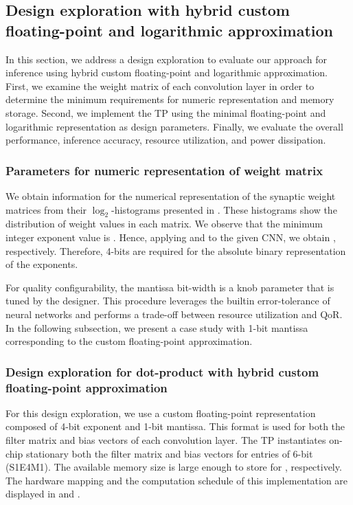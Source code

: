 \subsection{Design exploration with hybrid custom floating-point and logarithmic approximation}

In this section, we address a design exploration to evaluate our approach for inference using hybrid custom floating-point and logarithmic approximation. First, we examine the weight matrix of each convolution layer in order to determine the minimum requirements for numeric representation and memory storage. Second, we implement the TP using the minimal floating-point and logarithmic representation as design parameters. Finally, we evaluate the overall performance, inference accuracy, resource utilization, and power dissipation.

\subsubsection{Parameters for numeric representation of weight matrix}
\label{sec:parameters}
We obtain information for the numerical representation of the synaptic weight matrices from their $\log_2$-histograms presented in {}. These histograms show the distribution of weight values in each matrix. We observe that the minimum integer exponent value is . Hence, applying  and  to the given CNN, we obtain , respectively. Therefore, 4-bits are required for the absolute binary representation of the exponents.

For quality configurability, the mantissa bit-width is a knob parameter that is tuned by the designer. This procedure leverages the builtin error-tolerance of neural networks and performs a trade-off between resource utilization and QoR. In the following subsection, we present a case study with 1-bit mantissa corresponding to the custom floating-point approximation.

\subsubsection{Design exploration for dot-product with hybrid custom floating-point approximation}
For this design exploration, we use a custom floating-point representation composed of 4-bit exponent and 1-bit mantissa. This format is used for both the filter matrix and bias vectors of each convolution layer. The TP instantiates on-chip stationary both the filter matrix and bias vectors for  entries of 6-bit (S1E4M1). The available memory size is large enough to store  for , respectively. The hardware mapping and the computation schedule of this implementation are displayed in  and .


